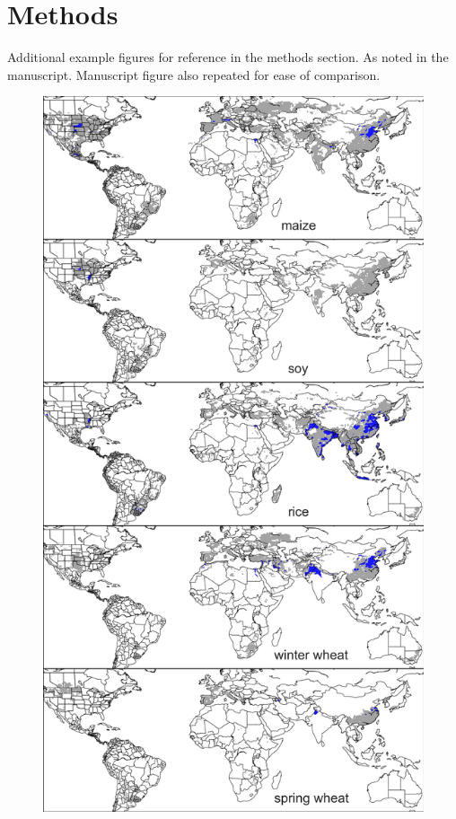 \documentclass[10pt]{article}
\begin{document}
{\tableofcontents

\clearpage
\modulolinenumbers[2]
\linenumbers

\renewcommand{\thefigure}{S\arabic{figure}}

\section{Methods}
Additional example figures for reference in the methods section. As noted in the manuscript. Manuscript figure also repeated for ease of comparison.

\begin{figure}[h!]
\centering
\begin{minipage}{.45\textwidth}
    \centering
    \vspace{0pt}
    \includegraphics[width=\textwidth]{s_croparea_irr.png}\\

\end{minipage}
\end{figure}}
\end{document}
